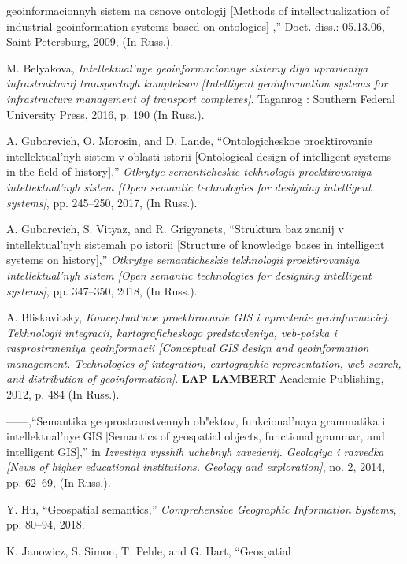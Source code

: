 \documentclass{article}
\begin{document}
\begin{multicols}{2}
\begin{itemize}
{geoinformacionnyh sistem na osnove ontologij [Methods
of intellectualization of industrial geoinformation systems based
on ontologies] ,” Doct. diss.: 05.13.06, Saint-Petersburg, 2009,
(In Russ.).
\renewcommand{\labelitemi}{[4]}
\item M. Belyakova,  \textit{Intellektual’nye geoinformacionnye sistemy dlya
upravleniya infrastrukturoj transportnyh kompleksov [Intelligent
geoinformation systems for infrastructure management of transport
complexes]}. Taganrog : Southern Federal University Press, 2016,
p. 190 (In Russ.).
\renewcommand{\labelitemi}{[5]}
\item A. Gubarevich, O. Morosin, and D. Lande, “Ontologicheskoe
proektirovanie intellektual’nyh sistem v oblasti istorii [Ontological
design of intelligent systems in the field of history],”  \textit{Otkrytye
semanticheskie tekhnologii proektirovaniya intellektual’nyh sistem
[Open semantic technologies for designing intelligent systems]},
pp. 245–250, 2017, (In Russ.).
\renewcommand{\labelitemi}{[6]}
\item A. Gubarevich, S. Vityaz, and R. Grigyanets, “Struktura baz znanij
v intellektual’nyh sistemah po istorii [Structure of knowledge
bases in intelligent systems on history],”  \textit{Otkrytye semanticheskie
tekhnologii proektirovaniya intellektual’nyh sistem [Open semantic
technologies for designing intelligent systems]}, pp. 347–350, 2018,
(In Russ.).
\renewcommand{\labelitemi}{[7]}
\item A. Bliskavitsky,  \textit{Konceptual’noe proektirovanie GIS i upravlenie
geoinformaciej. Tekhnologii integracii, kartograficheskogo
predstavleniya, veb-poiska i rasprostraneniya geoinformacii
[Conceptual GIS design and geoinformation management.
Technologies of integration, cartographic representation, web
search, and distribution of geoinformation]}. \textbf{LAP LAMBERT}
Academic Publishing, 2012, p. 484 (In Russ.).
\renewcommand{\labelitemi}{[8]}
\item  ——,“Semantika geoprostranstvennyh ob"ektov, funkcional’naya
grammatika i intellektual’nye GIS [Semantics of geospatial objects,
functional grammar, and intelligent GIS],” in  \textit{Izvestiya vysshih
uchebnyh zavedenij. Geologiya i razvedka [News of higher
educational institutions. Geology and exploration]}, no. 2, 2014,
pp. 62–69, (In Russ.).
\renewcommand{\labelitemi}{[9]}
\item  Y. Hu, “Geospatial semantics,”  \textit{Comprehensive Geographic Information Systems}, pp. 80–94, 2018.
\renewcommand{\labelitemi}{[10]}
\item K. Janowicz, S. Simon, T. Pehle, and G. Hart, “Geospatial
}
\end{itemize}
\end{multicols}
\end{document}
